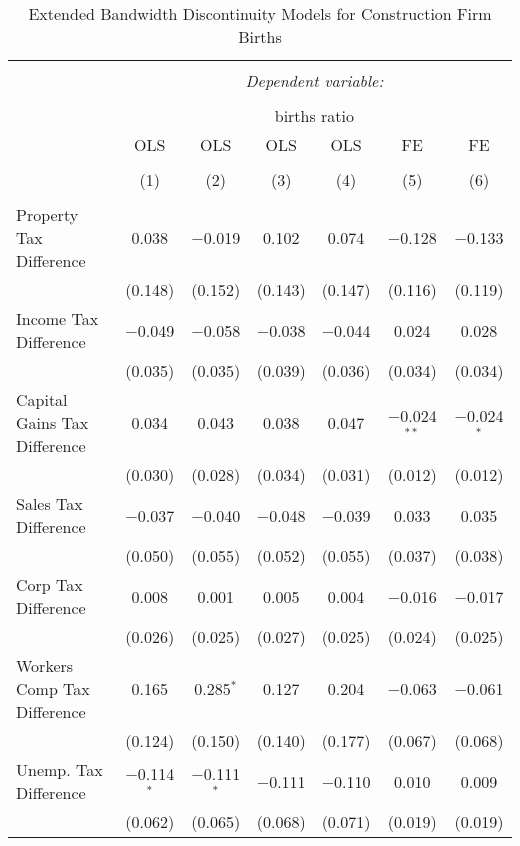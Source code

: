 
\begin{table}[!htbp] \centering 
  \caption{Extended Bandwidth Discontinuity Models for  Construction Firm Births} 
  \label{23rd} 
\begin{tabular}{@{\extracolsep{5pt}}lcccccc} 
\\[-1.8ex]\hline 
\hline \\[-1.8ex] 
 & \multicolumn{6}{c}{\textit{Dependent variable:}} \\ 
\cline{2-7} 
\\[-1.8ex] & \multicolumn{6}{c}{births ratio} \\ 
 & OLS & OLS & OLS & OLS & FE & FE \\ 
\\[-1.8ex] & (1) & (2) & (3) & (4) & (5) & (6)\\ 
\hline \\[-1.8ex] 
 Property Tax Difference & 0.038 & $-$0.019 & 0.102 & 0.074 & $-$0.128 & $-$0.133 \\ 
  & (0.148) & (0.152) & (0.143) & (0.147) & (0.116) & (0.119) \\ 
  Income Tax Difference & $-$0.049 & $-$0.058 & $-$0.038 & $-$0.044 & 0.024 & 0.028 \\ 
  & (0.035) & (0.035) & (0.039) & (0.036) & (0.034) & (0.034) \\ 
  Capital Gains Tax Difference & 0.034 & 0.043 & 0.038 & 0.047 & $-$0.024$^{**}$ & $-$0.024$^{*}$ \\ 
  & (0.030) & (0.028) & (0.034) & (0.031) & (0.012) & (0.012) \\ 
  Sales Tax Difference & $-$0.037 & $-$0.040 & $-$0.048 & $-$0.039 & 0.033 & 0.035 \\ 
  & (0.050) & (0.055) & (0.052) & (0.055) & (0.037) & (0.038) \\ 
  Corp Tax Difference & 0.008 & 0.001 & 0.005 & 0.004 & $-$0.016 & $-$0.017 \\ 
  & (0.026) & (0.025) & (0.027) & (0.025) & (0.024) & (0.025) \\ 
  Workers Comp Tax Difference & 0.165 & 0.285$^{*}$ & 0.127 & 0.204 & $-$0.063 & $-$0.061 \\ 
  & (0.124) & (0.150) & (0.140) & (0.177) & (0.067) & (0.068) \\ 
  Unemp. Tax Difference & $-$0.114$^{*}$ & $-$0.111$^{*}$ & $-$0.111 & $-$0.110 & 0.010 & 0.009 \\ 
  & (0.062) & (0.065) & (0.068) & (0.071) & (0.019) & (0.019) \\ 

\end{tabular}
\end{table}
